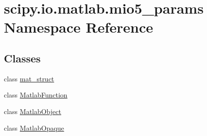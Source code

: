 \hypertarget{namespacescipy_1_1io_1_1matlab_1_1mio5__params}{}\section{scipy.\+io.\+matlab.\+mio5\+\_\+params Namespace Reference}
\label{namespacescipy_1_1io_1_1matlab_1_1mio5__params}
\subsection*{Classes}
\begin{DoxyCompactItemize}
\item 
class \hyperlink{classscipy_1_1io_1_1matlab_1_1mio5__params_1_1mat__struct}{mat\+\_\+struct}
\item 
class \hyperlink{classscipy_1_1io_1_1matlab_1_1mio5__params_1_1MatlabFunction}{Matlab\+Function}
\item 
class \hyperlink{classscipy_1_1io_1_1matlab_1_1mio5__params_1_1MatlabObject}{Matlab\+Object}
\item 
class \hyperlink{classscipy_1_1io_1_1matlab_1_1mio5__params_1_1MatlabOpaque}{Matlab\+Opaque}
\end{DoxyCompactItemize}

